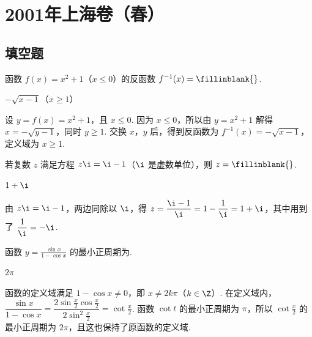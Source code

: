 \chapter{2001年上海卷（春）}

\section{填空题}

\begin{problem}
函数 \(f(x)=x^{2}+1\)（\(x\leqslant 0\)）的反函数 \(f^{-1}(x)=\fillinblank{}\).
\end{problem}

\begin{answer}
\(-\sqrt{x-1}\)（\(x\geqslant1\)）
\end{answer}

\begin{solution}
设 \(y=f(x)=x^{2}+1\)，且 \(x\leqslant0\). 因为 \(x\leqslant0\)，所以由 \(y=x^{2}+1\) 解得 \(x=-\sqrt{y-1}\)，同时 \(y\geqslant1\). 交换 \(x\)，\(y\) 后，得到反函数为 \(f^{-1}(x)=-\sqrt{x-1}\)，定义域为 \(x\geqslant1\).
\end{solution}

\begin{problem}
若复数 \(z\) 满足方程 \(z\i=\i-1\)（\(\i\) 是虚数单位），则 \(z=\fillinblank{}\).
\end{problem}

\begin{answer}
\(1+\i\)
\end{answer}

\begin{solution}
由 \(z\i=\i-1\)，两边同除以 \(\i\)，得 \(z=\dfrac{\i-1}{\i}=1-\dfrac{1}{\i}=1+\i\)，其中用到了 \(\dfrac{1}{\i}=-\i\).
\end{solution}

\begin{problem}
函数 \(y=\frac{\sin x}{1-\cos x}\) 的最小正周期为\fillinblank{}.
\end{problem}

\begin{answer}
\(2\pi\)
\end{answer}

\begin{solution}
函数的定义域满足 \(1-\cos x\ne0\)，即 \(x\ne2k\pi\)（\(k\in\Z\)）. 在定义域内，\(\dfrac{\sin x}{1-\cos x}=\dfrac{2\sin\frac{x}{2}\cos\frac{x}{2}}{2\sin^{2}\frac{x}{2}}=\cot\frac{x}{2}\). 函数 \(\cot t\) 的最小正周期为 \(\pi\)，所以 \(\cot\frac{x}{2}\) 的最小正周期为 \(2\pi\)，且这也保持了原函数的定义域.
\end{solution}


